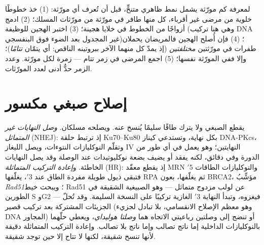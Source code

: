 \begin{method}\label{met:b3:dna-repair:complementation}
لمعرفة كم مورّثة يشمل نمط ظاهري متنحٍّ، قبل أن تُعرف أي مورّثة:
(1) خذ خطوطًا خلوية من مرضى غير أقرباء، كل منها طافر في مورّثة من
مورّثات المسلك؛ (2) ادمج أزواجًا من الخطوط في خلايا هجينة؛
(3) اختبر الهجين للوظيفة (وهي هنا تركيب DNA غير المجدول
بعد الضوء فوق البنفسجي)؛ (4) فإن أُصلح الهجين فالمريضان يحملان طفرات
في مورّثتين \emph{مختلفتين} (إذ يمدّ كل منهما الآخر
ببروتينه الناقص: أي يتمّان \emph{تتامًا})؛ وإلا ففي المورّثة نفسها؛
(5) اجمع المرضى في زمر تتام --- زمرة لكل مورّثة.
وعدد الزمر حدٌّ أدنى لعدد المورّثات.
\end{method}

\section{إصلاح صبغي مكسور}

\begin{definition}\label{def:b3:dna-repair:dsb}
\emph{} يقطع الصبغي ولا يترك طاقًا سليمًا يُنسخ
عنه. ويصلحه مسلكان. \emph{وصل النهايات غير
المتماثل} (NHEJ): إذ ترتبط حلقة Ku70--Ku80 بكل نهاية، وتستدعي
كيناز DNA-PKcs، وتقلّم النوكليازات النتوءات، ويصل الليغاز IV
النهايتين؛ وهو يعمل في أي طور من الدورة وفي دقائق، لكنه يفقد أو
يضيف بضعة نوكليوتيدات عند الوصلة وقد يصل النهايات الخاطئة.
و\emph{إعادة التركيب المتماثلة} (HR): إذ يقطع معقّد MRN والنوكليازات
الطاقات 5$'$ فتبقى ذيول طويلة مفردة الطاق عند 3$'$،
يغلّفها RPA ثم يغلّفها، بعون BRCA2، مؤشِّبُ
\emph{Rad51}؛ ويبحث خيط Rad51 عن لولب مزدوج متماثل
--- وهو الصبيغية الشقيقة في الطورين S وG2 --- فيغزوه، وتبدأ النهاية
3$'$ الغازية تركيبًا على النسخة السليمة. وقد تُحلّ الجزيئات المشتركة
بعد تركيب قصير (وهو معظم الإصلاح الانقسامي، بلا تبادل لجزيء DNA المجاور)
أو تنضج إلى وصلتين رباعيتي الاتجاه هما
\emph{وصلتا هوليداي}، ويعطي حلّهما بالنوكليازات الداخلية إما ناتج
تصالب وإما ناتج بلا تصالب. وإعادة التركيب المتماثلة دقيقة لأنها
تنسخ شقيقة، لكنها لا تتاح إلا حين توجد شقيقة.
\end{definition}

